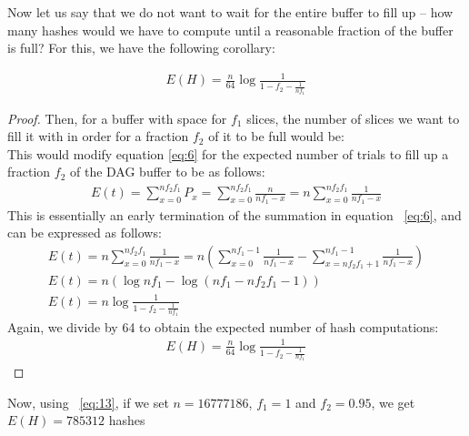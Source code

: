 \documentclass[runningheads]{llncs}
\begin{document}
Now let us say that we do not want to wait for the entire buffer to fill up -- how many hashes would we have to compute until a reasonable fraction of the buffer is full? For this, we have the following corollary:
\begin{corollary}
\label{earlyTermination}
    \begin{gather}
		E(H) = \frac{n}{64}\log{\frac{1}{1-f_2-\frac{1}{nf_1}}}
	\end{gather}
\end{corollary}
\begin{proof}
Then, for a buffer with space for $f_1$ slices, the number of slices we want to fill it with in order for a fraction $f_2$ of it to be full would be: \\
This would modify equation \ref{eq:6} for the expected number of trials to fill up a fraction $f_2$ of the DAG buffer to be as follows:
\begin{gather}
    E(t) = \sum_{x=0}^{nf_2f_1}P_x = \sum_{x=0}^{nf_2f_1}\frac{n}{nf_1-x} = n\sum_{x=0}^{nf_2f_1}\frac{1}{nf_1-x}
\end{gather}
This is essentially an early termination of the summation in equation ~\ref{eq:6}, and can be expressed as follows:
\begin{gather}
    E(t) = n\sum_{x=0}^{nf_2f_1}\frac{1}{nf_1-x} = n(\sum_{x=0}^{nf_1-1}\frac{1}{nf_1-x} - \sum_{x=nf_2f_1+1}^{nf_1-1}\frac{1}{nf_1-x})\\
    E(t) = n(\log{nf_1} - \log{(nf_1-nf_2f_1-1)}) \\
    E(t) = n\log{\frac{1}{1-f_2-\frac{1}{nf_1}}}
\end{gather}
Again, we divide by 64 to obtain the expected number of hash computations:
\begin{gather}
    E(H) = \frac{n}{64}\log{\frac{1}{1-f_2-\frac{1}{nf_1}}}
\end{gather}
\end{proof}
Now, using ~\ref{eq:13}, if we set $n = 16777186$, $f_1 = 1$ and $f_2 = 0.95$, we get $E(H) = 785312$ hashes

\end{document}
